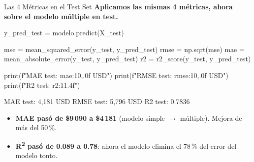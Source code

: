 \documentclass[aspectratio=169, 11pt]{beamer}
\begin{document}
\begin{frame}[fragile,shrink=42]{Las 4 Métricas en el Test Set}
  \vspace{-6pt}
  {\footnotesize\color{arcaDark}\bfseries
    Aplicamos las mismas 4 métricas, ahora sobre el modelo \textbf{múltiple}
    en \textbf{test}.}

  \vspace{4pt}
  \begin{pyblock}
y_pred_test = modelo.predict(X_test)

mse  = mean_squared_error(y_test, y_pred_test)
rmse = np.sqrt(mse)
mae  = mean_absolute_error(y_test, y_pred_test)
r2   = r2_score(y_test, y_pred_test)

print(f"MAE  test: {mae:10,.0f}  USD")
print(f"RMSE test: {rmse:10,.0f}  USD")
print(f"R2   test: {r2:11.4f}")
  \end{pyblock}

  \vspace{4pt}
  \begin{outputblock}
MAE  test:      4,181  USD
RMSE test:      5,796  USD
R2   test:     0.7836
  \end{outputblock}

  \vspace{4pt}
  {\scriptsize\color{textMuted}
  \begin{itemize}\setlength{\itemsep}{3pt}
    \item[{\color{codeGreen}\scriptsize\faCheckCircle}]
      \textbf{MAE pasó de \$9\,090 a \$4\,181} (modelo simple $\to$ múltiple).
      Mejora de más del 50\,\%.
    \item[{\color{codeGreen}\scriptsize\faCheckCircle}]
      \textbf{R\textsuperscript{2} pasó de 0.089 a 0.78}: ahora el modelo
      elimina el 78\,\% del error del modelo tonto.
  \end{itemize}
  }
\end{frame}
\end{document}

